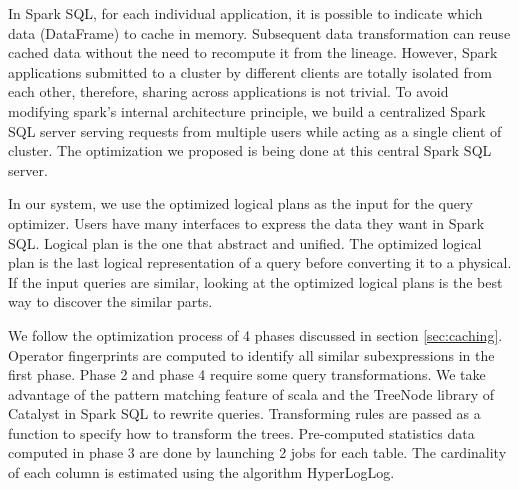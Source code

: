 In Spark SQL, for each individual application, it is possible to indicate which data (DataFrame) to cache in memory. Subsequent data transformation can reuse cached data without the need to recompute it from the lineage. However, Spark applications submitted to a cluster by different clients are totally isolated from each other\cite{zaharia2012resilient}, therefore, sharing across applications is not trivial. To avoid modifying spark's internal architecture principle, we build a centralized Spark SQL server serving requests from multiple users while acting as a single client of cluster. The optimization we proposed is being done at this central Spark SQL server.

In our system, we use the optimized logical plans as the input for the query optimizer. Users have many interfaces to express the data they want in Spark SQL. Logical plan is the one that abstract and unified. The optimized logical plan is the last logical representation of a query before converting it to a physical. If the input queries are similar, looking at the optimized logical plans is the best way to discover the similar parts.

We follow the optimization process of 4 phases discussed in section \ref{sec:caching}. Operator fingerprints are computed to identify all similar subexpressions in the first phase. Phase 2 and phase 4 require some query transformations. We take advantage of the pattern matching feature of scala and the TreeNode library of Catalyst in Spark SQL to rewrite queries. Transforming rules are passed as a function to specify how to transform the trees. Pre-computed statistics data computed in phase 3 are done by launching 2 jobs for each table. The cardinality of each column is estimated using the algorithm HyperLogLog.